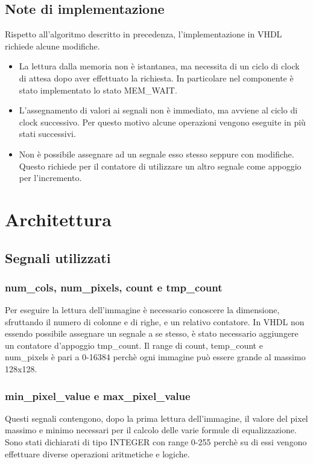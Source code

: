 \documentclass{article}
\begin{document}
\subsection{Note di implementazione}
Rispetto all'algoritmo descritto in precedenza, l'implementazione in VHDL richiede alcune modifiche.
\begin{itemize}
    \item La lettura dalla memoria non è istantanea, ma necessita di un ciclo di clock di attesa dopo aver effettuato la richiesta. In particolare nel componente è stato implementato lo stato MEM\_WAIT.
    \item L'assegnamento di valori ai segnali non è immediato, ma avviene al ciclo di clock successivo. Per questo motivo alcune operazioni vengono eseguite in più stati successivi.
    \item Non è possibile assegnare ad un segnale esso stesso seppure con modifiche. Questo richiede per il contatore di utilizzare un altro segnale come appoggio per l'incremento.
\end{itemize}

\pagebreak

\section{Architettura}
\subsection{Segnali utilizzati}

\subsubsection{num\_cols, num\_pixels, count e tmp\_count}
Per eseguire la lettura dell'immagine è necessario conoscere la dimensione, sfruttando il numero di colonne e di righe, e un relativo contatore. In VHDL non essendo possibile assegnare un segnale a se stesso, è stato necessario aggiungere un contatore d'appoggio tmp\_count. Il range di count, temp\_count e num\_pixels è pari a 0-16384 perchè ogni immagine può essere grande al massimo 128x128.

\subsubsection{min\_pixel\_value e max\_pixel\_value}
Questi segnali contengono, dopo la prima lettura dell'immagine, il valore del pixel massimo e minimo necessari per il calcolo delle varie formule di equalizzazione. Sono stati dichiarati di tipo INTEGER con range 0-255 perchè su di essi vengono effettuare diverse operazioni aritmetiche e logiche.
\end{document}
